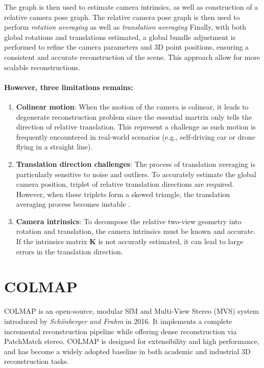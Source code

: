 The graph is then used to estimate camera intrinsics, as well as construction of a relative camera pose graph.
The relative camera pose graph is then used to perform \emph{rotation averaging} as well as \emph{translation averaging} \cite{Chatterjee2013, theia-manual, moulon2016openmvg}
Finally, with both global rotations and translations estimated, a global bundle adjustment is performed to refine the camera parameters and 3D point positions, ensuring a consistent and accurate reconstruction of the scene.
This approach allow for more scalable reconstructions.

\paragraph{However, three limitations remains:}
\begin{enumerate}
    \item \textbf{Colinear motion}: When the motion of the camera is colinear, it leads to degenerate reconstruction problem since the essential martrix only tells the direction of relative translation.
    This represent a challenge as such motion is frequently encountered in real-world scenarios (e.g., self-driving car or drone flying in a straight line).
    \item \textbf{Translation direction challenges}: The process of translation averaging is particularly sensitive to noise and outliers. 
    To accurately estimate the global camera position, triplet of relative translation directions are required. However, when these triplets form a skewed triangle, the translation averaging process becomes instable \cite{manam2023sensitivity}.
    \item \textbf{Camera intrinsics}: To decompose the relative two-view geometry into rotation and translation, the camera intrinsics must be known and accurate.
    If the intrinsics matrix $\mathbf{K}$ is not accuratly estimated, it can lead to large errors in the translation direction.
\end{enumerate}

\section{COLMAP}\label{sec:colmap}
COLMAP \cite{schoenberger2016sfm} is an open-source, modular SfM and Multi-View Stereo (MVS) system introduced by \textit{Schönberger and Frahm} in 2016. 
It implements a complete incremental reconstruction pipeline while offering dense reconstruction via PatchMatch stereo. COLMAP is designed for extensibility and high performance, and has become a widely adopted baseline in both academic and industrial 3D reconstruction tasks.

